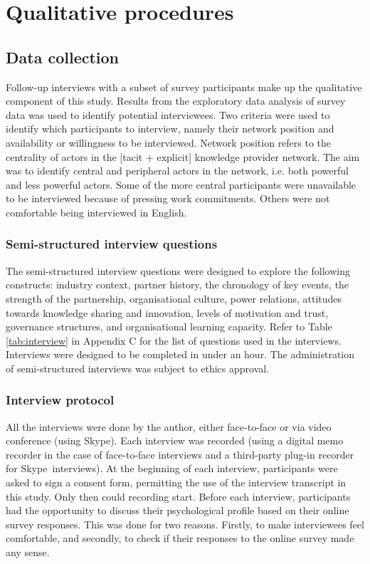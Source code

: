 \section{Qualitative procedures}

\subsection{Data collection}

Follow-up interviews with a subset of survey participants make up the qualitative component of this study. Results from the exploratory data analysis of survey data was used to identify potential interviewees. Two criteria were used to identify which participants to interview, namely their network position and availability or willingness to be interviewed. Network position refers to the centrality of actors in the [tacit + explicit] knowledge provider network. The aim was to identify central and peripheral actors in the network, i.e. both powerful and less powerful actors. Some of the more central participants were unavailable to be interviewed because of pressing work commitments. Others were not comfortable being interviewed in English. 

\subsubsection{Semi-structured interview questions}

The semi-structured interview questions were designed to explore the following constructs: industry context, partner history, the chronology of key events, the strength of the partnership, organisational culture, power relations, attitudes towards knowledge sharing and innovation, levels of motivation and trust, governance structures, and organisational learning capacity. Refer to Table \ref{tab:interview} in Appendix C for the list of questions used in the interviews. Interviews were designed to be completed in under an hour. The administration of semi-structured interviews was subject to ethics approval. 

\subsubsection{Interview protocol}

All the interviews were done by the author, either face-to-face or via video conference (using Skype\texttrademark). Each interview was recorded (using a digital memo recorder in the case of face-to-face interviews and a third-party plug-in recorder for Skype\texttrademark\ interviews). At the beginning of each interview, participants were asked to sign a consent form, permitting the use of the interview transcript in this study. Only then could recording start. Before each interview, participants had the opportunity to discuss their psychological profile based on their online survey responses. This was done for two reasons. Firstly, to make interviewees feel comfortable, and secondly, to check if their responses to the online survey made any sense. \medskip

